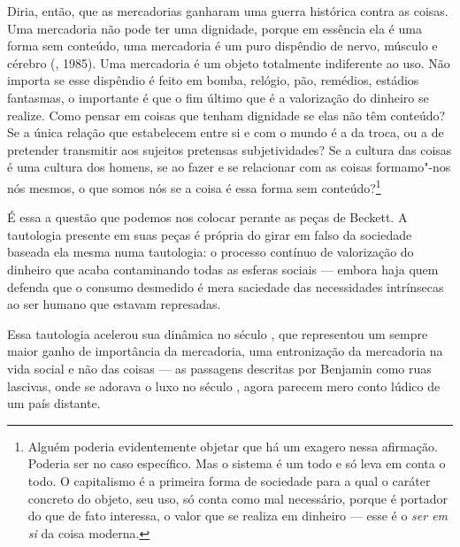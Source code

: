 Diria, então, que as mercadorias ganharam uma guerra
histórica contra as coisas. Uma mercadoria não pode ter uma dignidade,
porque em essência ela é uma forma sem conteúdo, uma mercadoria é um
puro dispêndio de nervo, músculo e cérebro (, 1985). Uma mercadoria
é um objeto totalmente indiferente ao uso. Não importa se esse dispêndio
é feito em bomba, relógio, pão, remédios, estádios fantasmas, o
importante é que o fim último que é a valorização do dinheiro se
realize. Como pensar em coisas que tenham dignidade se elas não têm
conteúdo? Se a única relação que estabelecem entre si e com o mundo é a
da troca, ou a de pretender transmitir aos sujeitos pretensas
subjetividades? Se a cultura das coisas é uma cultura dos homens, se ao
fazer e se relacionar com as coisas formamo"-nos nós mesmos, o que somos
nós se a coisa é essa forma sem conteúdo?\footnote{Alguém poderia
  evidentemente objetar que há um exagero nessa afirmação. Poderia ser
  no caso específico. Mas o sistema é um todo e só leva em conta o todo.
  O capitalismo é a primeira forma de sociedade para a qual o caráter
  concreto do objeto, seu uso, só conta como mal necessário, porque é
  portador do que de fato interessa, o valor que se realiza em dinheiro
  --- esse é o \emph{ser em si} da coisa moderna.}

É essa a questão que podemos nos colocar perante as peças de Beckett.
A tautologia presente em suas peças é própria do girar em
falso da sociedade baseada ela mesma numa tautologia: o processo
contínuo de valorização do dinheiro que acaba contaminando todas as
esferas sociais --- embora haja quem defenda que o consumo desmedido é
mera saciedade das necessidades intrínsecas ao ser humano que estavam
represadas.

Essa tautologia acelerou sua dinâmica no século , que representou um
sempre maior ganho de importância da mercadoria, uma entronização da
mercadoria na vida social e não das coisas --- as passagens descritas por
Benjamin como ruas lascivas, onde se adorava o luxo no século , agora
parecem mero conto lúdico de um país distante.

